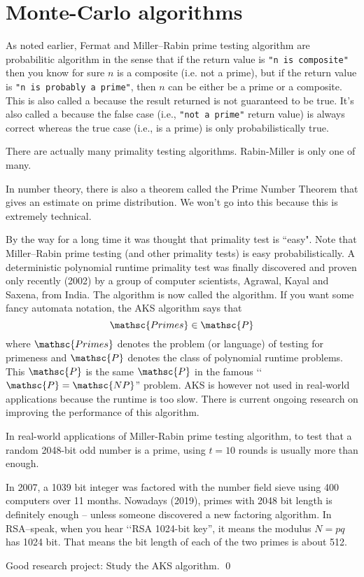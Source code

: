 \section{Monte-Carlo algorithms}

As noted earlier, Fermat and Miller--Rabin prime testing algorithm
are probabilitic algorithm in the sense that if the
return value is \verb!"n is composite"! then you know for sure $n$ is a
composite (i.e. not a prime), 
but if the return value is
\verb!"n is probably a prime"!,
then $n$ can be either be a prime or a
composite.
This is also called a
because the result returned is not guaranteed to be true.
It's also called a  because the
false case (i.e., \verb!"not a prime"! return value) is always correct whereas the
true case (i.e., is a prime) is only probabilistically true.

There are actually many primality testing algorithms.
Rabin-Miller is only one of many.

In number theory, there is also a theorem called the Prime Number
Theorem that gives an estimate on prime distribution. We won't go
into this because this is extremely technical.

By the way for a long time it was thought that primality test is
``easy".
Note that Miller--Rabin prime testing (and other primality tests)
is easy probabilistically.
A deterministic polynomial runtime
primality test was finally discovered and proven only recently
(2002) by a group of computer scientists, Agrawal, Kayal and Saxena, from India.
The algorithm is now called the
algorithm.
If you want some fancy automata notation, the AKS algorithm
says that
\[
  \mathsc{Primes} \in \mathsc{P}
\]
where $\mathsc{Primes}$ denotes the problem (or language) of
testing for primeness and $\mathsc{P}$
denotes the class of polynomial runtime problems.
This $\mathsc{P}$ is the same $\mathsc{P}$ in the famous
\lq\lq$\mathsc{P} = \mathsc{NP}$'' problem.
AKS is however not used in real-world applications because the runtime
is too slow.
There is current ongoing research on improving the performance
of this algorithm.

In real-world applications of Miller-Rabin prime testing algorithm,
to test that a random 2048-bit odd number is a prime,
using $t = 10$ rounds is usually more than enough.

In 2007, a 1039 bit integer was factored with the number field sieve using
400 computers over 11 months.
Nowadays (2019), primes with 2048 bit length is definitely enough -- unless
someone discovered a new factoring algorithm.
In RSA--speak, when you hear \lq\lq RSA 1024-bit key'', it means
the modulus $N = pq$ has 1024 bit.
That means the bit length of each of the two primes is about 512.


\begin{ex}
  Good research project:
  Study the AKS algorithm.
  \qed
\end{ex}
